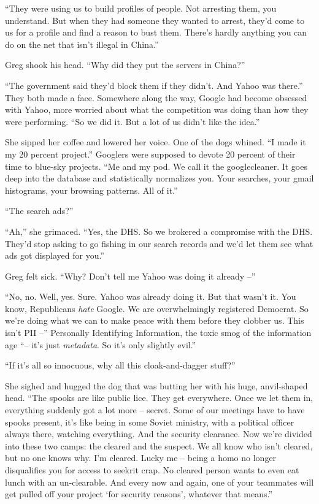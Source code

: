 “They were using us to build profiles of people. Not arresting them, 
you understand. But when they had someone they wanted to arrest, they'd 
come to us for a profile and find a reason to bust them. There's hardly 
anything you can do on the net that isn't illegal in China.”

Greg shook his head. “Why did they put the servers in China?”

“The government said they'd block them if they didn't. And Yahoo was 
there.” They both made a face. Somewhere along the way, Google had 
become obsessed with Yahoo, more worried about what the competition was 
doing than how they were performing. “So we did it. But a lot of us 
didn't like the idea.”

She sipped her coffee and lowered her voice. One of the dogs whined. 
“I made it my 20 percent project.” Googlers were supposed to devote 
20 percent of their time to blue-sky projects. “Me and my pod. We 
call it the googlecleaner. It goes deep into the database and 
statistically normalizes you. Your searches, your gmail histograms, 
your browsing patterns. All of it.”

“The search ads?”

“Ah,” she grimaced. “Yes, the DHS. So we brokered a compromise 
with the DHS. They'd stop asking to go fishing in our search records 
and we'd let them see what ads got displayed for you.”

Greg felt sick. “Why? Don't tell me Yahoo was doing it already --”

“No, no. Well, yes. Sure. Yahoo was already doing it. But that wasn't 
it. You know, Republicans \emph{hate} Google. We are overwhelmingly 
registered Democrat. So we're doing what we can to make peace with them 
before they clobber us. This isn't PII --” Personally Identifying 
Information, the toxic smog of the information age “-- it's just 
\emph{metadata}. So it's only slightly evil.”

“If it's all so innocuous, why all this cloak-and-dagger stuff?”

She sighed and hugged the dog that was butting her with his huge, 
anvil-shaped head. “The spooks are like public lice. They get 
everywhere. Once we let them in, everything suddenly got a lot more -- 
secret. Some of our meetings have to have spooks present, it's like 
being in some Soviet ministry, with a political officer always there, 
watching everything. And the security clearance. Now we're divided into 
these two camps: the cleared and the suspect. We all know who isn't 
cleared, but no one knows why. I'm cleared. Lucky me -- being a homo no 
longer disqualifies you for access to seekrit crap. No cleared person 
wants to even eat lunch with an un-clearable. And every now and again, 
one of your teammates will get pulled off your project `for security 
reasons', whatever that means.”

